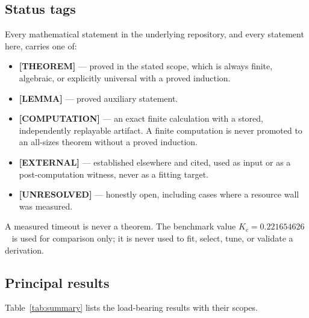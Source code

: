\documentclass[11pt]{article}
\theoremstyle{definition}
\begin{document}
\subsection{Status tags}
Every mathematical statement in the underlying repository, and every statement here, carries one of:
\begin{itemize}[leftmargin=*,itemsep=1pt]
\item \textbf{[THEOREM]} --- proved in the stated scope, which is always finite, algebraic, or
      explicitly universal with a proved induction.
\item \textbf{[LEMMA]} --- proved auxiliary statement.
\item \textbf{[COMPUTATION]} --- an exact finite calculation with a stored, independently replayable
      artifact. A finite computation is never promoted to an all-sizes theorem without a proved
      induction.
\item \textbf{[EXTERNAL]} --- established elsewhere and cited, used as input or as a
      post-computation witness, never as a fitting target.
\item \textbf{[UNRESOLVED]} --- honestly open, including cases where a resource wall was measured.
\end{itemize}
A measured timeout is never a theorem. The benchmark value $K_c=0.221654626$~\cite{ferrenberg2018}
is used for comparison only; it is never used to fit, select, tune, or validate a derivation.

\subsection{Principal results}
Table~\ref{tab:summary} lists the load-bearing results with their scopes.
\end{document}
